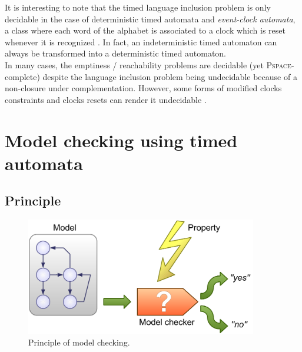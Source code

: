 It is interesting to note that the timed language inclusion problem is only decidable in the case of deterministic timed automata and \emph{event-clock automata}, a class where each word of the alphabet is associated to a clock which is reset whenever it is recognized \cite{RALF94}. In fact, an indeterministic timed automaton can always be transformed into a deterministic timed automaton.\\

In many cases, the emptiness / reachability problems are decidable (yet \textsc{Pspace}-complete) despite the language inclusion problem being undecidable because of a non-closure under complementation. However, some forms of modified clocks constraints and clocks resets can render it undecidable \cite{BerDuf-IPL2000,RADLD94,Miller00,BDFP04,BBVD+99,LSV:07:12,VDPG97}.


\section{Model checking using timed automata}


\subsection{Principle}


\begin{figure}[htbp]
    \centering
    \includegraphics[width=0.9\textwidth]{content/timed-automata/model-checking}
    \caption{Principle of model checking.}
    \label{fig:model-checking}
\end{figure}

